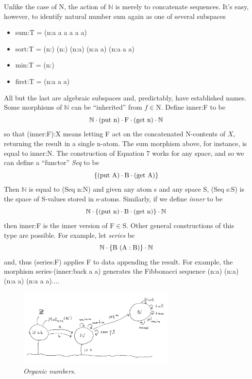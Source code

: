 \documentclass[11pt]{article}
\begin{document}
Unlike the case of N, the action of ${\mathbb N}$ is merely to concatenate sequences.  It's easy, however, to identify 
natural number sum again as one of several subspaces 
\begin{itemize}
\item sum:T = (n:a a a a a a)
\item sort:T = (n:) (n:) (n:a) (n:a a) (n:a a a)
\item min:T = (n:)
\item first:T = (n:a a a)
\end{itemize} 
All but the last are algebraic subspaces and, predictably, have established names.  
Some morphisms of ${\mathbb N}$ can be ``inherited'' from $f\in$N.  Define inner:F to be 
\begin{equation}
{\mathbb N}\cdot({\rm put\ n})\cdot {\rm F}\cdot({\rm get\ n})\cdot{\mathbb N}
\end{equation}
so that (inner:F):X means letting F act on the concatenated N-contents of $X$, returning the result in a single n-atom.  The sum morphism 
above, for instance, is equal to inner:N.  The construction of Equation 7 works for any space, and so we can define a ``functor'' {\it Seq} to be 
\begin{equation}
\{({\rm put}\ {\rm A})\cdot {\rm B} \cdot ({\rm get}\ {\rm A})\}
\end{equation}
Then {$\mathbb N$} is equal to (Seq n:N) and given any atom s and any space S, (Seq s:S) is the space of S-values stored in s-atoms.  
Similarly, if we define {\it inner} to be  
\begin{equation}
{\mathbb N}\cdot\{({\rm put\ n})\cdot{\rm B}\cdot({\rm get\ n})\}\cdot{\mathbb N}
\end{equation}
then inner:F is the inner version of F$\in$S.  Other general constructions of this type are possible.  For example, let {\it series} be 
\begin{equation}
{\mathbb N}\cdot\{{\rm B\ (A:B)}\}\cdot{\mathbb N} 
\end{equation}
and, thus (series:F) applies F to data appending the result.  For example, the morphism series$\cdot$(inner:back a a)
generates the Fibbonacci sequence (n:a) (n:a) (n:a a) (n:a a a)$\dots$.

\begin{figure}[h]
\centering
\includegraphics[width=0.7\textwidth]{organics.png}
\caption{{\it Organic numbers.}}
\end{figure}
\end{document}
